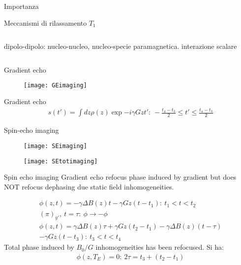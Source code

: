 \begin{frame}{Importanza }
    
\end{frame}

\begin{frame}{Meccanismi di rilassamento $T_1$}
\begin{columns}  \begin{column}{0.5\textwidth}
dipolo-dipolo: nucleo-nucleo, nucleo-specie paramagnetica.
interazione scalare
\end{column} \begin{column}{0.5\textwidth}

\end{column}  \end{columns}
\begin{frame}{Gradient echo}
\begin{figure}[!ht]\texttt{[image: GEimaging]}\end{figure}

\end{frame}

\begin{wordonframe}{Gradient echo}
\begin{align*}
&s(t')=\int d z\rho(z)\exp{-i\gamma Gzt'}:\ -\frac{t_4-t_3}{2}\leq t'\leq \frac{t_4-t_3}{2}
\end{align*}
\end{wordonframe}

\begin{frame}[allowframebreaks]{Spin-echo imaging}
\begin{figure}[!ht]\texttt{[image: SEimaging]}\end{figure}
\begin{figure}[!ht]\texttt{[image: SEtotimaging]}\end{figure}
\end{frame}

\begin{wordonframe}{Spin echo imaging}
Gradient echo refocus phase induced by gradient but does NOT refocus dephasing due static field inhomogeneities.

\begin{align*}
&\phi(z,t)=-\gamma\Delta B(z)t-\gamma Gz(t-t_1):\ t_1<t<t_2\\
&(\pi)_{y'},\ t=\tau:\ \phi\to-\phi\\
&\phi(z,t)=\gamma\Delta B(z)\tau+\gamma Gz(t_2-t_1)-\gamma\Delta B(z)(t-\tau)\\
&-\gamma Gz(t-t_3):\ t_3<t<t_4
\end{align*}
Total phase induced by $B_0/G$ inhomogeneities has been refocused.
Si ha:
\begin{align*}
&\phi(z,T_E)=0:\ 2\tau=t_3+(t_2-t_1)
\end{align*}
\end{wordonframe}



\end{frame}
